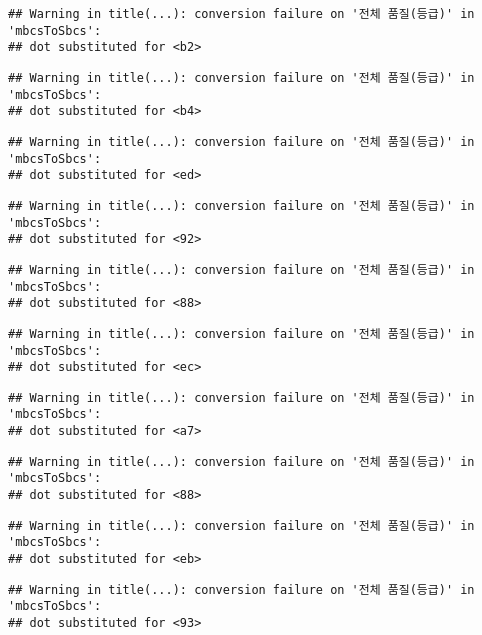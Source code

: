 \documentclass[
]{article}
\begin{document}
\begin{verbatim}
## Warning in title(...): conversion failure on '전체 품질(등급)' in 'mbcsToSbcs':
## dot substituted for <b2>
\end{verbatim}

\begin{verbatim}
## Warning in title(...): conversion failure on '전체 품질(등급)' in 'mbcsToSbcs':
## dot substituted for <b4>
\end{verbatim}

\begin{verbatim}
## Warning in title(...): conversion failure on '전체 품질(등급)' in 'mbcsToSbcs':
## dot substituted for <ed>
\end{verbatim}

\begin{verbatim}
## Warning in title(...): conversion failure on '전체 품질(등급)' in 'mbcsToSbcs':
## dot substituted for <92>
\end{verbatim}

\begin{verbatim}
## Warning in title(...): conversion failure on '전체 품질(등급)' in 'mbcsToSbcs':
## dot substituted for <88>
\end{verbatim}

\begin{verbatim}
## Warning in title(...): conversion failure on '전체 품질(등급)' in 'mbcsToSbcs':
## dot substituted for <ec>
\end{verbatim}

\begin{verbatim}
## Warning in title(...): conversion failure on '전체 품질(등급)' in 'mbcsToSbcs':
## dot substituted for <a7>
\end{verbatim}

\begin{verbatim}
## Warning in title(...): conversion failure on '전체 품질(등급)' in 'mbcsToSbcs':
## dot substituted for <88>
\end{verbatim}

\begin{verbatim}
## Warning in title(...): conversion failure on '전체 품질(등급)' in 'mbcsToSbcs':
## dot substituted for <eb>
\end{verbatim}

\begin{verbatim}
## Warning in title(...): conversion failure on '전체 품질(등급)' in 'mbcsToSbcs':
## dot substituted for <93>
\end{verbatim}
\end{document}
